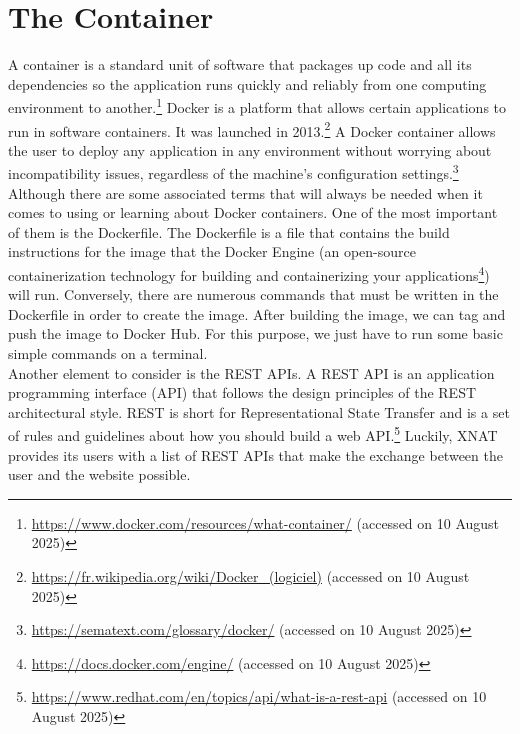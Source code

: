 \section{The Container}
A container is a standard unit of software that packages up code and all its dependencies so the application runs quickly and reliably from one computing environment to another.\footnote{\url{https://www.docker.com/resources/what-container/} (accessed on 10 August 2025)}
Docker is a platform that allows certain applications to run in software containers. It was launched in 2013.\footnote{\url{https://fr.wikipedia.org/wiki/Docker\_(logiciel)} (accessed on 10 August 2025)} A Docker container allows the user to deploy any application in any environment without worrying about incompatibility issues, regardless of the machine’s configuration settings.\footnote{\url{https://sematext.com/glossary/docker/} (accessed on 10 August 2025)} Although there are some associated terms that will always be needed when it comes to using or learning about Docker containers.
One of the most important of them is the Dockerfile. The Dockerfile is a file that contains the build instructions for the image that the Docker Engine (an open-source containerization technology for building and containerizing your applications\footnote{\url{https://docs.docker.com/engine/} (accessed on 10 August 2025)}) will run. Conversely, there are numerous commands that must be written in the Dockerfile in order to create the image. After building the image, we can tag and push the image to Docker Hub. For this purpose, we just have to run some basic simple commands on a terminal.
\\
Another element to consider is the REST APIs. A REST API is an application programming interface (API) that follows the design principles of the REST architectural style. REST is short for Representational State Transfer and is a set of rules and guidelines about how you should build a web API.\footnote{\url{https://www.redhat.com/en/topics/api/what-is-a-rest-api} (accessed on 10 August 2025)} Luckily, XNAT provides its users with a list of REST APIs that make the exchange between the user and the website possible. 

